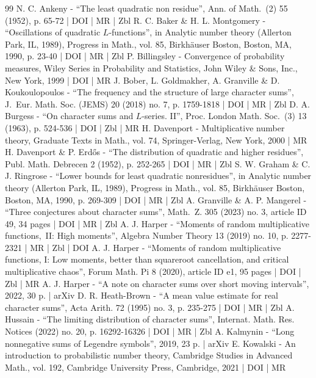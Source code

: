 \documentclass[10pt]{amsart}
\theoremstyle{plain}
\theoremstyle{definition}
\begin{document}
\begin{thebibliography}{99}
N. C. Ankeny - “The least quadratic non residue”, Ann. of Math. (2) 55 (1952), p. 65-72 | DOI | MR | Zbl
R. C. Baker \& H. L. Montgomery - “Oscillations of quadratic $L$-functions”, in Analytic number theory (Allerton Park, IL, 1989), Progress in Math., vol. 85, Birkhäuser Boston, Boston, MA, 1990, p. 23-40 | DOI | MR | Zbl
P. Billingsley - Convergence of probability measures, Wiley Series in Probability and Statistics, John Wiley \& Sons, Inc., New York, 1999 | DOI | MR
J. Bober, L. Goldmakher, A. Granville \& D. Koukoulopoulos - “The frequency and the structure of large character sums”, J. Eur. Math. Soc. (JEMS) 20 (2018) no. 7, p. 1759-1818 | DOI | MR | Zbl
D. A. Burgess - “On character sums and $L$-series. II”, Proc. London Math. Soc. (3) 13 (1963), p. 524-536 | DOI | Zbl | MR
H. Davenport - Multiplicative number theory, Graduate Texts in Math., vol. 74, Springer-Verlag, New York, 2000 | MR
H. Davenport \& P. Erdős - “The distribution of quadratic and higher residues”, Publ. Math. Debrecen 2 (1952), p. 252-265 | DOI | MR | Zbl
S. W. Graham \& C. J. Ringrose - “Lower bounds for least quadratic nonresidues”, in Analytic number theory (Allerton Park, IL, 1989), Progress in Math., vol. 85, Birkhäuser Boston, Boston, MA, 1990, p. 269-309 | DOI | MR | Zbl
A. Granville \& A. P. Mangerel - “Three conjectures about character sums”, Math. Z. 305 (2023) no. 3, article ID 49, 34 pages | DOI | MR | Zbl
A. J. Harper - “Moments of random multiplicative functions, II: High moments”, Algebra Number Theory 13 (2019) no. 10, p. 2277-2321 | MR | Zbl | DOI
A. J. Harper - “Moments of random multiplicative functions, I: Low moments, better than squareroot cancellation, and critical multiplicative chaos”, Forum Math. Pi 8 (2020), article ID e1, 95 pages | DOI | Zbl | MR
A. J. Harper - “A note on character sums over short moving intervals”, 2022, 30 p. | arXiv
D. R. Heath-Brown - “A mean value estimate for real character sums”, Acta Arith. 72 (1995) no. 3, p. 235-275 | DOI | MR | Zbl
A. Hussain - “The limiting distribution of character sums”, Internat. Math. Res. Notices (2022) no. 20, p. 16292-16326 | DOI | MR | Zbl
A. Kalmynin - “Long nonnegative sums of Legendre symbols”, 2019, 23 p. | arXiv
E. Kowalski - An introduction to probabilistic number theory, Cambridge Studies in Advanced Math., vol. 192, Cambridge University Press, Cambridge, 2021 | DOI | MR

\end{thebibliography}
\end{document}
